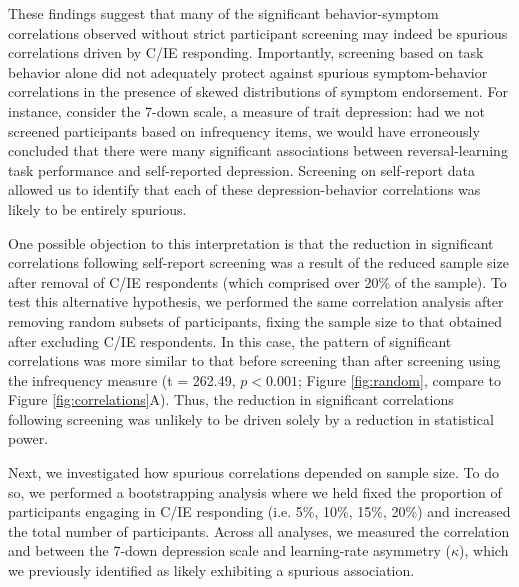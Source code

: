 \documentclass[a4paper,notitlepage,12pt]{article}
\begin{document}
\begin{refsection}[main]
These findings suggest that many of the significant behavior-symptom correlations observed without strict participant screening may indeed be spurious correlations driven by C/IE responding. Importantly, screening based on task behavior alone did not adequately protect against spurious symptom-behavior correlations in the presence of skewed distributions of symptom endorsement. For instance, consider the 7-down scale, a measure of trait depression: had we not screened participants based on infrequency items, we would have erroneously concluded that there were many significant associations between reversal-learning task performance and self-reported depression. Screening on self-report data allowed us to identify that each of these depression-behavior correlations was likely to be entirely spurious.

One possible objection to this interpretation is that the reduction in significant correlations following self-report screening was a result of the reduced sample size after removal of C/IE respondents (which comprised over 20\% of the sample). To test this alternative hypothesis, we performed the same correlation analysis after removing random subsets of participants, fixing the sample size to that obtained after excluding C/IE respondents. In this case, the pattern of significant correlations was more similar to that before screening than after screening using the infrequency measure (t = 262.49, $p < 0.001$; Figure \ref{fig:random}, compare to Figure \ref{fig:correlations}A). Thus, the reduction in significant correlations following screening was unlikely to be driven solely by a reduction in statistical power.

Next, we investigated how spurious correlations depended on sample size. To do so, we performed a bootstrapping analysis where we held fixed the proportion of participants engaging in C/IE responding (i.e. 5\%, 10\%, 15\%, 20\%) and increased the total number of participants. Across all analyses, we measured the correlation and between the 7-down depression scale and learning-rate asymmetry ($\kappa$), which we previously identified as likely exhibiting a spurious association. 


\end{refsection}
\end{document}
